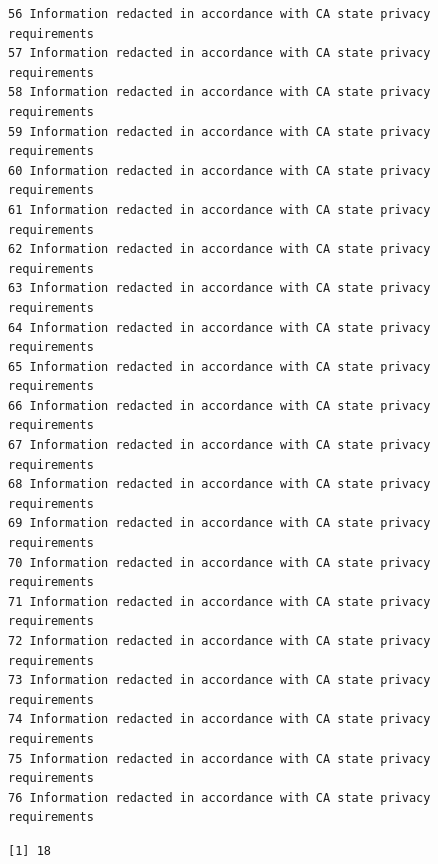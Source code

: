 \documentclass[
  letterpaper,
  DIV=11,
  numbers=noendperiod]{scrartcl}
\newenvironment{Shaded}{\begin{snugshade}}{\end{snugshade}}
\newcommand{\FloatTok}[1]{\textcolor[rgb]{0.68,0.00,0.00}{#1}}
\newcommand{\FunctionTok}[1]{\textcolor[rgb]{0.28,0.35,0.67}{#1}}
\newcommand{\NormalTok}[1]{\textcolor[rgb]{0.00,0.23,0.31}{#1}}
\newcommand{\SpecialCharTok}[1]{\textcolor[rgb]{0.37,0.37,0.37}{#1}}
\begin{document}
\begin{verbatim}
56 Information redacted in accordance with CA state privacy requirements
57 Information redacted in accordance with CA state privacy requirements
58 Information redacted in accordance with CA state privacy requirements
59 Information redacted in accordance with CA state privacy requirements
60 Information redacted in accordance with CA state privacy requirements
61 Information redacted in accordance with CA state privacy requirements
62 Information redacted in accordance with CA state privacy requirements
63 Information redacted in accordance with CA state privacy requirements
64 Information redacted in accordance with CA state privacy requirements
65 Information redacted in accordance with CA state privacy requirements
66 Information redacted in accordance with CA state privacy requirements
67 Information redacted in accordance with CA state privacy requirements
68 Information redacted in accordance with CA state privacy requirements
69 Information redacted in accordance with CA state privacy requirements
70 Information redacted in accordance with CA state privacy requirements
71 Information redacted in accordance with CA state privacy requirements
72 Information redacted in accordance with CA state privacy requirements
73 Information redacted in accordance with CA state privacy requirements
74 Information redacted in accordance with CA state privacy requirements
75 Information redacted in accordance with CA state privacy requirements
76 Information redacted in accordance with CA state privacy requirements
\end{verbatim}

\begin{Shaded}
\end{Shaded}

\begin{verbatim}
[1] 18
\end{verbatim}

\begin{Shaded}
\end{Shaded}
\end{document}
